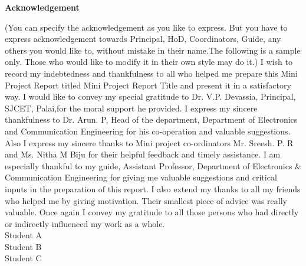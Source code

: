 \newpage
\thispagestyle{empty}
\begin{center}
  \vspace*{1cm}
  \textbf{\large Acknowledgement}
\end{center}
(You can specify the acknowledgement as you like to express. But you have
to express acknowledgement towards Principal, HoD, Coordinators, Guide,
any others you would like to, without mistake in their name.The following is
a sample only. Those who would like to modify it in their own style may do
it.)
I wish to record my indebtedness and thankfulness to all who helped me prepare this Mini Project Report titled Mini Project Report Title and present it
in a satisfactory way.
I would like to convey my special gratitude to Dr. V.P. Devassia, Principal, SJCET, Palai,for the moral support he provided. I express my sincere
thankfulness to Dr. Arun. P, Head of the department, Department of Electronics and Communication Engineering for his co-operation and valuable
suggestions. Also I express my sincere thanks to Mini project co-ordinators
Mr. Sreesh. P. R and Ms. Nitha M Biju for their helpful feedback and timely
assistance.
I am especially thankful to my guide, Assistant Professor, Department of Electronics & Communication Engineering for giving me valuable suggestions and critical inputs in the preparation of this report.
I also extend my thanks to all my friends who helped me by giving motivation. Their smallest piece of advice was really valuable. Once again I convey
my gratitude to all those persons who had directly or indirectly influenced
my work as a whole.\\
Student A\\
Student B\\
Student C

